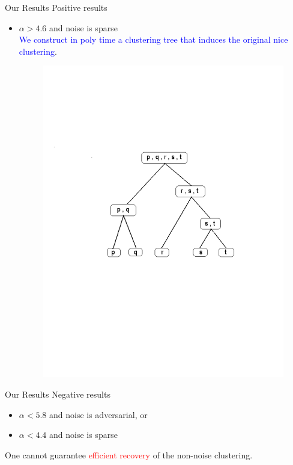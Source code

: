 \documentclass{beamer}
\begin{document}
\begin{frame}{Our Results}
 \alert{Positive results}
 \begin{itemize}
  	\item $\alpha > 4.6$ and noise is sparse\\ 	
	\textcolor{blue}{We construct  in poly time a clustering tree that induces the original nice clustering}.  	
	\begin{figure}
	  \includegraphics[trim = 50 150 50 200, clip, width=0.8\linewidth]{figures/hier.pdf}
	\end{figure}	  	
  \end{itemize}
  
\end{frame}

\begin{frame}{Our Results}
	\alert{Negative results}
  	\begin{itemize}
	  	\vspace{0.5cm}\item $\alpha < 5.8$ and noise is adversarial, or 
		\vspace{0.5cm}\item $\alpha < 4.4$ and noise is sparse
	\end{itemize}
	 \vspace{1.0cm}One cannot guarantee \textcolor{red}{ efficient recovery} of the non-noise clustering. 
\end{frame}
\end{document}
